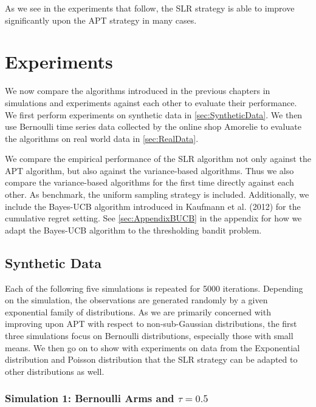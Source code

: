 \documentclass[11pt,]{article}
\begin{document}
As we see in the experiments that follow, the SLR strategy is able to
improve significantly upon the APT strategy in many cases.

\section{\texorpdfstring{Experiments
\label{chap:Experiments}}{Experiments }}\label{experiments}

We now compare the algorithms introduced in the previous chapters in
simulations and experiments against each other to evaluate their
performance. We first perform experiments on synthetic data in
\autoref{sec:SyntheticData}. We then use Bernoulli time series data
collected by the online shop Amorelie to evaluate the algorithms on real
world data in \autoref{sec:RealData}.

We compare the empirical performance of the SLR algorithm not only
against the APT algorithm, but also against the variance-based
algorithms. Thus we also compare the variance-based algorithms for the
first time directly against each other. As benchmark, the uniform
sampling strategy is included. Additionally, we include the Bayes-UCB
algorithm introduced in Kaufmann et al. (2012) for the cumulative regret
setting. See \autoref{sec:AppendixBUCB} in the appendix for how we adapt
the Bayes-UCB algorithm to the thresholding bandit problem.

\subsection{\texorpdfstring{Synthetic Data
\label{sec:SyntheticData}}{Synthetic Data }}\label{synthetic-data}

Each of the following five simulations is repeated for 5000 iterations.
Depending on the simulation, the observations are generated randomly by
a given exponential family of distributions. As we are primarily
concerned with improving upon APT with respect to non-sub-Gaussian
distributions, the first three simulations focus on Bernoulli
distributions, especially those with small means. We then go on to show
with experiments on data from the Exponential distribution and Poisson
distribution that the SLR strategy can be adapted to other distributions
as well.

\subsubsection{\texorpdfstring{Simulation 1: Bernoulli Arms and
\(\tau = 0.5\)}{Simulation 1: Bernoulli Arms and \textbackslash{}tau = 0.5}}\label{simulation-1-bernoulli-arms-and-tau-0.5}
\end{document}
